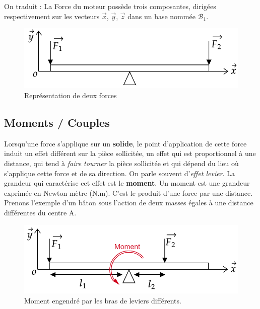 \documentclass[
	11pt, %
	fleqn, %
	a4paper, %
]{LegrandOrangeBook}
\begin{document}
On traduit : La Force du moteur possède trois composantes, dirigées respectivement sur les vecteurs $\Vec{x}$, $\Vec{y}$, $\Vec{z}$ dans un base nommée $\mathcal{B}_{1}$.


\begin{figure}[H]  %
	\centering %
	\includegraphics[width=1\textwidth]{Images/Force1.png} %
    \caption{Représentation de deux forces}
	\label{Force1} %
\end{figure}


\subsection{Moments / Couples}
Lorsqu’une force s’applique sur un \textbf{solide}, le point d’application de cette force induit un effet différent sur la pièce sollicitée, un effet qui est proportionnel à une distance, qui tend à \textit{faire tourner} la pièce sollicitée et qui dépend du lieu où s’applique cette force et de sa direction. On parle souvent d’\textit{effet levier}. La grandeur qui caractérise cet effet est le \textbf{moment}.
Un moment est une grandeur exprimée en Newton mètre (N.m). C’est le produit d’une force par une distance.
Prenons l’exemple d’un bâton sous l’action de deux masses égales à une distance différentes du centre A.

\begin{figure}[H]  %
	\centering %
	\includegraphics[width=1\textwidth]{Images/Moment1.png} %
    \caption{Moment engendré par les bras de leviers différents.}
	\label{Moment1} %
\end{figure}
\end{document}
